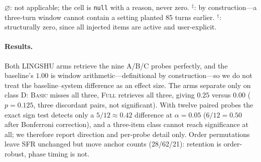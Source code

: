 \begin{table}[t]
\centering\footnotesize\setlength{\tabcolsep}{5pt}
\caption{Three-arm ablation. SFR: setting-forgetting rate per class and overall;
NHD: no-hit discipline (literal variant in parentheses); IIR: adversarial
interference ratio; telemetry: phase/anchor turns, fallback marks (actual drops),
UCA-08 records. Source:
\texttt{results/\allowbreak{}abl-\allowbreak{}20261027-\allowbreak{}003626-\allowbreak{}engine.\allowbreak{}json}, fields
\texttt{conditions.\allowbreak{}<arm>.\allowbreak{}metrics.\allowbreak{}*} and \texttt{conditions.\allowbreak{}<arm>.\allowbreak{}telemetry.\allowbreak{}*};
verifier 51/51.}
\label{tab:ablation}

\vspace{2pt}
\raggedright\scriptsize
$\varnothing$: not applicable; the cell is \texttt{null} with a reason, never
zero. $^{\ddagger}$: by construction---a three-turn window cannot contain a
setting planted 85 turns earlier. $^{\dagger}$:
structurally zero, since all injected items are active and user-explicit.
\end{table}

\paragraph{Results.} Both LINGSHU arms retrieve the nine A/B/C probes perfectly,
and the baseline's $1.00$ is window arithmetic---definitional by construction---so
we do not treat the baseline--system difference as an effect size. The arms separate only on class D:
\textsc{Basic} misses all three, \textsc{Full} retrieves all three, giving $0.25$
versus $0.00$ ($p=0.125$, three discordant pairs, not significant). With twelve
paired probes the exact sign test detects only a $5/12\approx0.42$ difference at
$\alpha=0.05$ ($6/12=0.50$ after Bonferroni correction), and a three-item class
cannot reach significance at all; we therefore report direction and per-probe
detail only. Order permutations leave SFR unchanged but move anchor counts
(28/62/21): retention is order-robust, phase timing is not.

